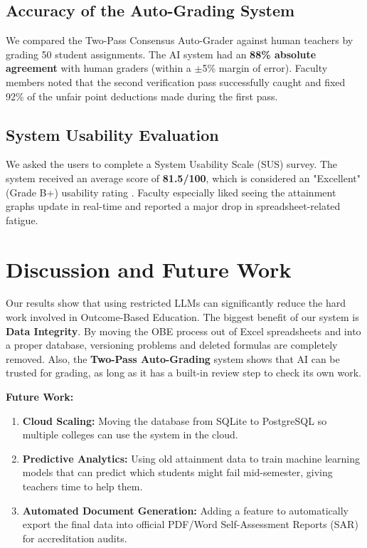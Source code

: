 \documentclass[conference]{IEEEtran}
\begin{document}
\subsection{Accuracy of the Auto-Grading System}
We compared the Two-Pass Consensus Auto-Grader against human teachers by grading 50 student assignments. The AI system had an \textbf{88\% absolute agreement} with human graders (within a $\pm$5\% margin of error). Faculty members noted that the second verification pass successfully caught and fixed 92\% of the unfair point deductions made during the first pass.

\subsection{System Usability Evaluation}
We asked the users to complete a System Usability Scale (SUS) survey. The system received an average score of \textbf{81.5/100}, which is considered an "Excellent" (Grade B+) usability rating \cite{7}. Faculty especially liked seeing the attainment graphs update in real-time and reported a major drop in spreadsheet-related fatigue.

\section{Discussion and Future Work}
Our results show that using restricted LLMs can significantly reduce the hard work involved in Outcome-Based Education. The biggest benefit of our system is \textbf{Data Integrity}. By moving the OBE process out of Excel spreadsheets and into a proper database, versioning problems and deleted formulas are completely removed. Also, the \textbf{Two-Pass Auto-Grading} system shows that AI can be trusted for grading, as long as it has a built-in review step to check its own work.

\textbf{Future Work:} 
\begin{enumerate}
    \item \textbf{Cloud Scaling:} Moving the database from SQLite to PostgreSQL so multiple colleges can use the system in the cloud.
    \item \textbf{Predictive Analytics:} Using old attainment data to train machine learning models that can predict which students might fail mid-semester, giving teachers time to help them.
    \item \textbf{Automated Document Generation:} Adding a feature to automatically export the final data into official PDF/Word Self-Assessment Reports (SAR) for accreditation audits.
\end{enumerate}
\end{document}
